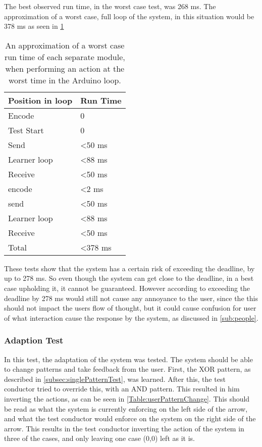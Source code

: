 The best observed run time, in the worst case test, was 268 ms. The approximation of a worst case, full loop of the system, in this situation would be 378 ms as seen in \cref{Table:WorstRunTimeAprox}

\begin{center}
	\begin{table}[htbp]
	  \centering
	  \begin{tabular}{l l}
		\toprule
		Position in loop		& Run Time  \\ \midrule
		Encode 			        & 0  	  	\\ \midrule
		Test Start		        & 0  		\\ \midrule
		Send   			        & <50 ms     \\ \midrule
		Learner loop 	        & <88 ms     \\ \midrule
		Receive 		        & <50 ms     \\ \midrule
		encode 			        & <2 ms      \\ \midrule
		send   			        & <50 ms     \\ \midrule
		Learner loop 	        & <88 ms	    \\ \midrule
		Receive 		        & <50 ms     \\ \midrule \midrule
		Total			        & <378 ms     \\
                                            \bottomrule
	  \end{tabular}
	  \caption{An approximation of a worst case run time of each separate module, when performing an action at the worst time in the Arduino loop.}\label{Table:WorstRunTimeAprox}
	\end{table}
\end{center}

These tests show that the system has a certain risk of exceeding the deadline, by up to 278 ms. So even though the system can get close to the deadline, in a best case upholding it, it cannot be guaranteed. However according to \cite{jakobnielsen} exceeding the deadline by 278 ms would still not cause any annoyance to the user, since the this should not impact the users flow of thought, but it could cause confusion for user of what interaction cause the response by the system, as discussed in \cref{sub:people}.
\subsubsection{Adaption Test}
In this test, the adaptation of the system was tested. The system should be able to change patterns and take feedback from the user. First, the XOR pattern, as described in \cref{subsec:singlePatternTest}, was learned. After this, the test conductor tried to override this, with an AND pattern. This resulted in him inverting the actions, as can be seen in \cref{Table:userPatternChange}. This should be read as what the system is currently enforcing on the left side of the arrow, and what the test conductor would enforce on the system on the right side of the arrow. This results in the test conductor inverting the action of the system in three of the cases, and only leaving one case (0,0) left as it is.

